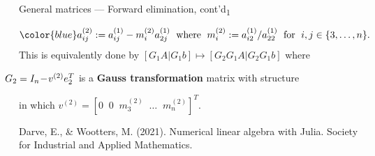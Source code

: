 \documentclass[t,usepdftitle=false]{beamer}
\begin{document}
\begin{frame}{General matrices --- Forward elimination, cont'd\textsubscript{1}}
\begin{itemize}
\begin{align*}
{\color{blue}a_{ij}^{(2)}}:=a^{(1)}_{ij}-m^{(2)}_{i}a^{(1)}_{2j}
\;\text{ where }\;
m^{(2)}_{i} := a^{(1)}_{i2}/a^{(1)}_{22}
\;\text{ for }\;
i,j\in\{3,\dots,n\}.
\end{align*}
This is equivalently done by $[G_1A|G_1b]\mapsto[G_2G_1A|G_2G_1b]$ where
\begin{center}
$\hspace{-.5cm}G_2=I_n\!-\!v^{(2)}e_2^T$
is a \textbf{Gauss transformation} matrix with structure
\vspace{-.15cm}
\end{center}
in which $\displaystyle v^{(2)}=[0\;\;0\;\;m^{(2)}_{3}\;\;\dots\;\;m^{(2)}_{n}]^T$.\vspace{.15cm}
\end{itemize}
\tiny{Darve, E., \& Wootters, M. (2021). Numerical linear algebra with Julia. Society for Industrial and Applied Mathematics.}
\end{frame}
\end{document}
